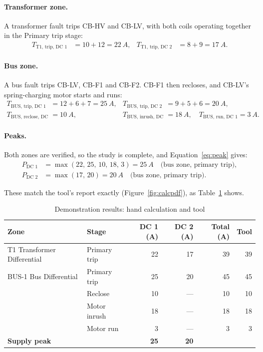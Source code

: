 \paragraph{Transformer zone.} A transformer fault trips CB-HV and CB-LV, with both
coils operating together in the Primary trip stage:
\begin{align*}
  T_{\text{T1, trip, DC 1}} &= 10 + 12 = \SI{22}{A}, &
  T_{\text{T1, trip, DC 2}} &= 8 + 9 = \SI{17}{A}.
\end{align*}

\paragraph{Bus zone.} A bus fault trips CB-LV, CB-F1 and CB-F2. CB-F1 then recloses,
and CB-LV's spring-charging motor starts and runs:
\begin{align*}
  T_{\text{BUS, trip, DC 1}} &= 12 + 6 + 7 = \SI{25}{A}, &
  T_{\text{BUS, trip, DC 2}} &= 9 + 5 + 6 = \SI{20}{A},\\
  T_{\text{BUS, reclose, DC 1}} &= \SI{10}{A}, &
  T_{\text{BUS, inrush, DC 1}} &= \SI{18}{A}, \quad
  T_{\text{BUS, run, DC 1}} = \SI{3}{A}.
\end{align*}

\paragraph{Peaks.} Both zones are verified, so the study is complete, and
Equation~\ref{eq:peak} gives:
\begin{align*}
  P_{\text{DC 1}} &= \max(22,\,25,\,10,\,18,\,3) = \SI{25}{A} \quad\text{(bus zone, primary trip)},\\
  P_{\text{DC 2}} &= \max(17,\,20) = \SI{20}{A} \quad\text{(bus zone, primary trip)}.
\end{align*}

These match the tool's report exactly (Figure~\ref{fig:calcpdf}), as
Table~\ref{tab:demoresults} shows.

\begin{table}[H]
  \centering
  \caption{Demonstration results: hand calculation and tool}
  \label{tab:demoresults}
  \begin{tabular}{l l r r r r}
    \toprule
    \textbf{Zone} & \textbf{Stage} & \textbf{DC 1 (A)} & \textbf{DC 2 (A)} & \textbf{Total (A)} & \textbf{Tool} \\
    \midrule
    T1 Transformer Differential & Primary trip & 22 & 17 & 39 & 39 \\
    BUS-1 Bus Differential & Primary trip & 25 & 20 & 45 & 45 \\
    & Reclose & 10 & --- & 10 & 10 \\
    & Motor inrush & 18 & --- & 18 & 18 \\
    & Motor run & 3 & --- & 3 & 3 \\
    \midrule
    \multicolumn{2}{l}{\textbf{Supply peak}} & \textbf{25} & \textbf{20} & & \\
    \bottomrule
  \end{tabular}
\end{table}

